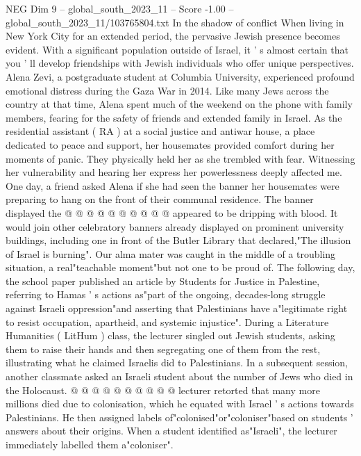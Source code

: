 \begin{textsample}{NEG Dim 9 – global\_south\_2023\_11 – Score -1.00 – global\_south\_2023\_11/103765804.txt}  \label{ex:f9_neg_434}
In the shadow of conflict When living in New York City for an extended period, the pervasive Jewish presence becomes evident.
With a significant population outside of Israel, it ' s almost certain that you ' ll develop friendships with Jewish individuals who offer unique perspectives.
Alena Zevi, a postgraduate student at Columbia University, experienced profound emotional distress during the Gaza War in 2014.
Like many Jews across the country at that time, Alena spent much of the weekend on the phone with family members, fearing for the safety of friends and extended family in Israel.
As the residential assistant ( RA ) at a social justice and antiwar house, a place dedicated to peace and support, her housemates provided comfort during her moments of panic.
They physically held her as she trembled with fear.
Witnessing her vulnerability and hearing her express her powerlessness deeply affected me.
One day, a friend asked Alena if she had seen the banner her housemates were preparing to hang on the front of their communal residence.
The banner displayed the @ @ @ @ @ @ @ @ @ @ appeared to be dripping with blood.
It would join other celebratory banners already displayed on prominent university buildings, including one in front of the Butler Library that declared,"The illusion of Israel is burning".
Our alma mater was caught in the middle of a troubling situation, a real"teachable moment"but not one to be proud of.
The following day, the school paper published an article by Students for Justice in Palestine, referring to Hamas ' s actions as"part of the ongoing, decades-long struggle against Israeli oppression"and asserting that Palestinians have a"legitimate right to resist occupation, apartheid, and systemic injustice".
During a Literature Humanities ( LitHum ) class, the lecturer singled out Jewish students, asking them to raise their hands and then segregating one of them from the rest, illustrating what he claimed Israelis did to Palestinians.
In a subsequent session, another classmate asked an Israeli student about the number of Jews who died in the Holocaust. @ @ @ @ @ @ @ @ @ @ lecturer retorted that many more millions died due to colonisation, which he equated with Israel ' s actions towards Palestinians.
He then assigned labels of"colonised"or"coloniser"based on students ' answers about their origins.
When a student identified as"Israeli", the lecturer immediately labelled them a"coloniser".

\end{textsample}
